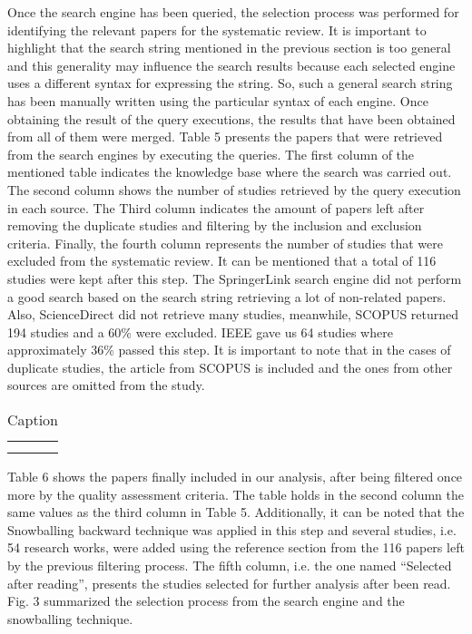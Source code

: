 \documentclass[peerreview]{IEEEtran}
\begin{document}
Once the search engine has been queried, the selection process was performed for identifying the relevant papers for the systematic review. It is important to highlight that the search string mentioned in the previous section is too general and this generality may influence the search results because each selected engine uses a different syntax for expressing the string. So, such a general search string has been manually written using the particular syntax of each engine.  Once obtaining the result of the query executions, the results that have been obtained from all of them were merged. Table 5 presents the papers that were retrieved from the search engines by executing the queries. The first column of the mentioned table indicates the knowledge base where the search was carried out. The second column shows the number of studies retrieved by the query execution in each source. The Third column indicates the amount of papers left after removing the duplicate studies and filtering by the inclusion and exclusion criteria. Finally, the fourth column represents the number of studies that were excluded from the systematic review. It can be mentioned that a total of 116 studies were kept after this step. The SpringerLink search engine did not perform a good search based on the search string retrieving a lot of non-related papers. Also, ScienceDirect did not retrieve many studies, meanwhile, SCOPUS returned 194 studies and a 60\% were excluded. IEEE gave us 64 studies where approximately 36\% passed this step. It is important to note that in the cases of duplicate studies, the article from SCOPUS is included and the ones from other sources are omitted from the study.


\begin{table}[]
    \centering
    \begin{tabular}{c|c}
         &  \\
         & 
    \end{tabular}
    \caption{Caption}
    \label{tab:my_label}
\end{table}


Table 6 shows the papers finally included in our analysis, after being filtered once more by the quality assessment criteria. The table holds in the second column the same values as the third column in Table 5. Additionally, it can be noted that the Snowballing backward technique was applied in this step and several studies, i.e. 54 research works, were added using the reference section from the 116 papers left by the previous filtering process. The fifth column, i.e. the one named “Selected after reading”, presents the studies selected for further analysis after been read. Fig. 3 summarized the selection process from the search engine and the snowballing technique.  
\end{document}
